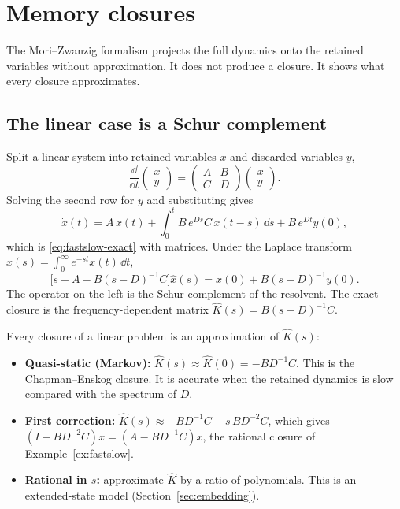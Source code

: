 \section{Memory closures}
\label{sec:memory}

The Mori--Zwanzig formalism \cite{Mori65,Zwanzig61,Zwanzig} projects the
full dynamics onto the retained variables without approximation. It does
not produce a closure. It shows what every closure approximates.

\subsection{The linear case is a Schur complement}

Split a linear system into retained variables $x$ and discarded variables
$y$,
\begin{equation}
  \frac{\dd}{\dd t}\begin{pmatrix}x\\y\end{pmatrix}
  =\begin{pmatrix}A&B\\C&D\end{pmatrix}\begin{pmatrix}x\\y\end{pmatrix}.
\end{equation}
Solving the second row for $y$ and substituting gives
\begin{equation}
  \dot x(t)=A\,x(t)+\int_0^tB\,e^{Ds}C\,x(t-s)\,\dd s+B\,e^{Dt}y(0),
  \label{eq:mz-linear}
\end{equation}
which is \eqref{eq:fastslow-exact} with matrices. Under the Laplace
transform $\hat x(s)=\int_0^\infty e^{-st}x(t)\,\dd t$,
\begin{equation}
  \bigl[s-A-B(s-D)^{-1}C\bigr]\hat x(s)=x(0)+B(s-D)^{-1}y(0) .
  \label{eq:schur}
\end{equation}
The operator on the left is the Schur complement of the resolvent. The
exact closure is the frequency-dependent matrix
$\hat K(s)=B(s-D)^{-1}C$.

Every closure of a linear problem is an approximation of $\hat K(s)$:
\begin{itemize}
  \item \textbf{Quasi-static (Markov):} $\hat K(s)\approx\hat K(0)=-BD^{-1}C$.
    This is the Chapman--Enskog closure. It is accurate when the retained
    dynamics is slow compared with the spectrum of $D$.
  \item \textbf{First correction:}
    $\hat K(s)\approx-BD^{-1}C-s\,BD^{-2}C$, which gives
    $(I+BD^{-2}C)\dot x=(A-BD^{-1}C)x$, the rational closure of
    Example~\ref{ex:fastslow}.
  \item \textbf{Rational in $s$:} approximate $\hat K$ by a ratio of
    polynomials. This is an extended-state model
    (Section~\ref{sec:embedding}).
\end{itemize}

